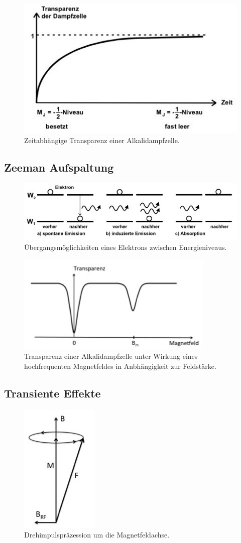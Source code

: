 \begin{figure}[H]
	\centering
	\includegraphics[width=0.6\linewidth]{content/grafik/transparenz.jpg}
	\caption{Zeitabhängige Transparenz einer Alkalidampfzelle. \cite{pumpen}}
	\label{fig:transparenz}
\end{figure}

\subsection{Zeeman Aufspaltung}

\begin{figure}[H]
	\centering
	\includegraphics[width=0.75\linewidth]{content/grafik/uebergang.jpg}
	\caption{Übergangsmöglichkeiten eines Elektrons zwischen Energieniveaus. \cite{pumpen}}
	\label{fig:uebergang}
\end{figure}

\begin{figure}[H]
	\centering
	\includegraphics[width=0.6\linewidth]{content/grafik/minima.jpg}
	\caption{Transparenz einer Alkalidampfzelle unter Wirkung eines hochfrequenten Magnetfeldes in Anbhängigkeit
			 zur Feldstärke. \cite{pumpen}}
	\label{fig:minima}
\end{figure}

\subsection{Transiente Effekte}

\begin{figure}[H]
	\centering
	\includegraphics[width=0.2\linewidth]{content/grafik/praezession.jpg}
	\caption{Drehimpulspräzession um die Magnetfeldachse. \cite{pumpen}}
	\label{fig:praezession}
\end{figure}

